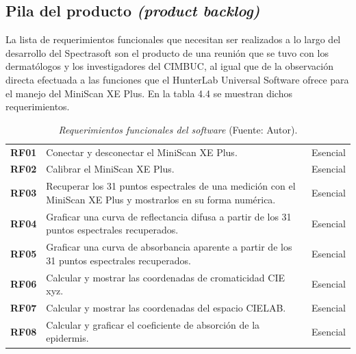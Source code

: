 \subsection{Pila del producto \textit{(product backlog)}}
	La lista de requerimientos funcionales que necesitan ser realizados a lo largo del desarrollo del Spectrasoft son el producto de una reuni\'{o}n que se tuvo con los dermat\'{o}logos y los investigadores del CIMBUC, al igual que de la observaci\'{o}n directa efectuada a las funciones que el HunterLab Universal Software ofrece para el manejo del MiniScan XE Plus. En la tabla 4.4 se muestran dichos requerimientos.
	
	\begin{table}[h]
		\small
		\caption[Requerimientos funcionales del software]{\textit{Requerimientos funcionales del software} (Fuente: Autor).}
		\centering
		\setlength{\extrarowheight}{\altocelda}
		\begin{tabulary}{\anchotabla}{|c|J|c|}
			\hline
			 &  & \\ \hline
			
			\textbf{RF01} & Conectar y desconectar el MiniScan XE Plus. & Esencial\\ \hline
			
			\textbf{RF02} & Calibrar el MiniScan XE Plus. & Esencial\\ \hline
			
			\textbf{RF03} & Recuperar los 31 puntos espectrales de una medici\'{o}n con el MiniScan XE Plus y mostrarlos en su forma num\'{e}rica. & Esencial\\ \hline

			\textbf{RF04} & Graficar una curva de reflectancia difusa a partir de los 31 puntos espectrales recuperados. & Esencial\\ \hline
			\textbf{RF05} & Graficar una curva de absorbancia aparente a partir de los 31 puntos espectrales recuperados. & Esencial\\ \hline
			\textbf{RF06} & Calcular y mostrar las coordenadas de cromaticidad CIE xyz. & Esencial\\ \hline
			
			\textbf{RF07} & Calcular y mostrar las coordenadas del espacio CIELAB. & Esencial\\ \hline

			\textbf{RF08} & Calcular y graficar el coeficiente de absorci\'{o}n de la epidermis. & Esencial\\ \hline


\end{tabulary}
\end{table}
